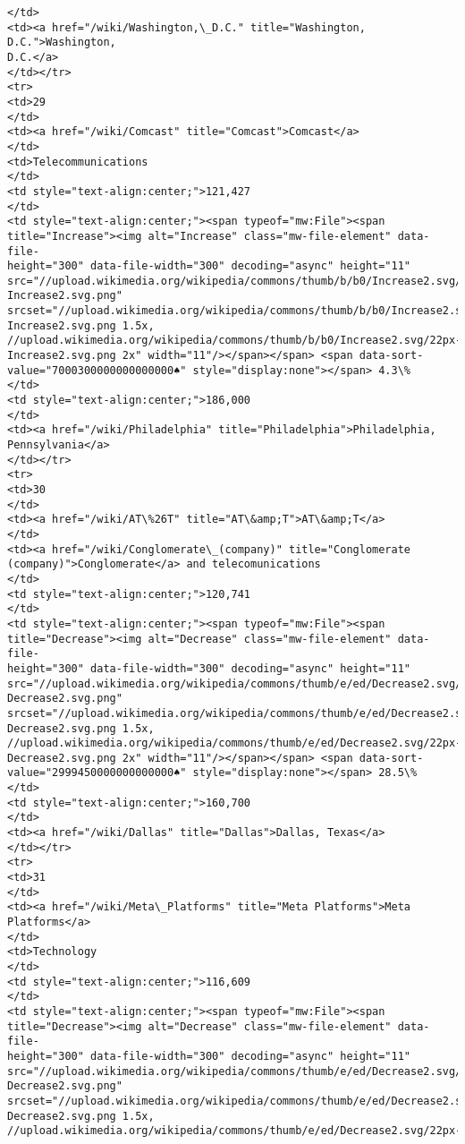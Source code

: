 \documentclass[11pt]{article}
\begin{document}
\begin{Verbatim}[commandchars=\\\{\}]
</td>
<td><a href="/wiki/Washington,\_D.C." title="Washington, D.C.">Washington,
D.C.</a>
</td></tr>
<tr>
<td>29
</td>
<td><a href="/wiki/Comcast" title="Comcast">Comcast</a>
</td>
<td>Telecommunications
</td>
<td style="text-align:center;">121,427
</td>
<td style="text-align:center;"><span typeof="mw:File"><span
title="Increase"><img alt="Increase" class="mw-file-element" data-file-
height="300" data-file-width="300" decoding="async" height="11"
src="//upload.wikimedia.org/wikipedia/commons/thumb/b/b0/Increase2.svg/11px-
Increase2.svg.png"
srcset="//upload.wikimedia.org/wikipedia/commons/thumb/b/b0/Increase2.svg/17px-
Increase2.svg.png 1.5x,
//upload.wikimedia.org/wikipedia/commons/thumb/b/b0/Increase2.svg/22px-
Increase2.svg.png 2x" width="11"/></span></span> <span data-sort-
value="7000300000000000000♠" style="display:none"></span> 4.3\%
</td>
<td style="text-align:center;">186,000
</td>
<td><a href="/wiki/Philadelphia" title="Philadelphia">Philadelphia,
Pennsylvania</a>
</td></tr>
<tr>
<td>30
</td>
<td><a href="/wiki/AT\%26T" title="AT\&amp;T">AT\&amp;T</a>
</td>
<td><a href="/wiki/Conglomerate\_(company)" title="Conglomerate
(company)">Conglomerate</a> and telecomunications
</td>
<td style="text-align:center;">120,741
</td>
<td style="text-align:center;"><span typeof="mw:File"><span
title="Decrease"><img alt="Decrease" class="mw-file-element" data-file-
height="300" data-file-width="300" decoding="async" height="11"
src="//upload.wikimedia.org/wikipedia/commons/thumb/e/ed/Decrease2.svg/11px-
Decrease2.svg.png"
srcset="//upload.wikimedia.org/wikipedia/commons/thumb/e/ed/Decrease2.svg/17px-
Decrease2.svg.png 1.5x,
//upload.wikimedia.org/wikipedia/commons/thumb/e/ed/Decrease2.svg/22px-
Decrease2.svg.png 2x" width="11"/></span></span> <span data-sort-
value="2999450000000000000♠" style="display:none"></span> 28.5\%
</td>
<td style="text-align:center;">160,700
</td>
<td><a href="/wiki/Dallas" title="Dallas">Dallas, Texas</a>
</td></tr>
<tr>
<td>31
</td>
<td><a href="/wiki/Meta\_Platforms" title="Meta Platforms">Meta Platforms</a>
</td>
<td>Technology
</td>
<td style="text-align:center;">116,609
</td>
<td style="text-align:center;"><span typeof="mw:File"><span
title="Decrease"><img alt="Decrease" class="mw-file-element" data-file-
height="300" data-file-width="300" decoding="async" height="11"
src="//upload.wikimedia.org/wikipedia/commons/thumb/e/ed/Decrease2.svg/11px-
Decrease2.svg.png"
srcset="//upload.wikimedia.org/wikipedia/commons/thumb/e/ed/Decrease2.svg/17px-
Decrease2.svg.png 1.5x,
//upload.wikimedia.org/wikipedia/commons/thumb/e/ed/Decrease2.svg/22px-

\end{Verbatim}
\end{document}
